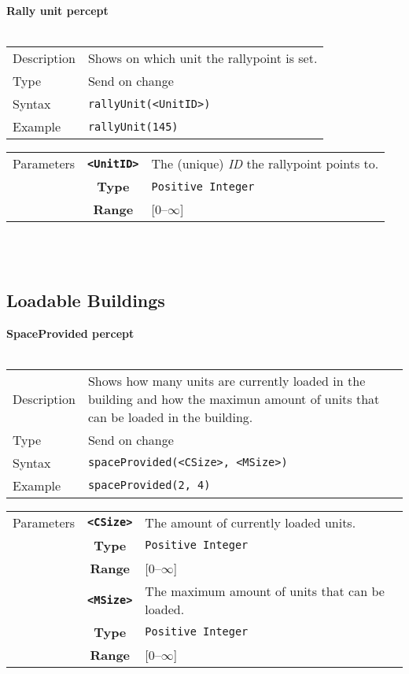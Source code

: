 \noindent
\textbf{Rally unit percept}\\
\\
\begin{tabularx}{\textwidth}{lX}
 Description & Shows on which unit the rallypoint is set. \\
 Type & Send on change \\
 Syntax & \verb|rallyUnit(<UnitID>)| \\
 Example & \verb|rallyUnit(145)| \\ 
 \end{tabularx}
 \begin{tabularx}{\textwidth}{l | c | p{8cm}|}
 \cline{2-3} 
 Parameters & \textbf{\verb|<UnitID>|} & The (unique) \textit{ID} the rallypoint points to. \\
            & \textbf{Type} & \verb|Positive Integer| \\
            & \textbf{Range} & [0--$\infty$] \\
            \cline{2-3} 
\end{tabularx}\\
\\
\subsection{Loadable Buildings}
\textbf{SpaceProvided percept}\\
\\
\begin{tabularx}{\textwidth}{lX}
 Description & Shows how many units are currently loaded in the building and how the maximun amount of units that can be loaded in the building. \\
 Type & Send on change \\
 Syntax & \verb|spaceProvided(<CSize>, <MSize>)| \\
 Example & \verb|spaceProvided(2, 4)| \\ 
 \end{tabularx}
 \begin{tabularx}{\textwidth}{l | c | p{8cm}|}
 \cline{2-3} 
 Parameters & \textbf{\verb|<CSize>|} & The amount of currently loaded units. \\
            & \textbf{Type} & \verb|Positive Integer| \\
            & \textbf{Range} & [0--$\infty$] \\
            \cline{2-3} 
            & \textbf{\verb|<MSize>|} & The maximum amount of units that can be loaded. \\
            & \textbf{Type} & \verb|Positive Integer| \\
            & \textbf{Range} & [0--$\infty$] \\
            \cline{2-3} 
\end{tabularx}\\

